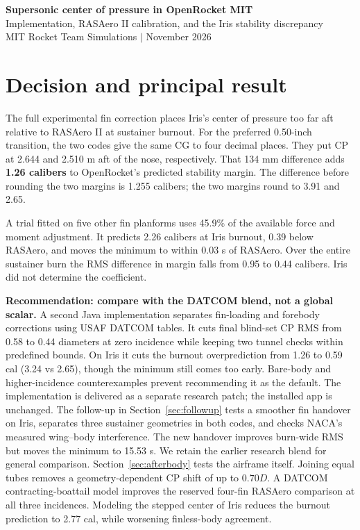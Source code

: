 \documentclass[10pt,letterpaper]{article}
\begin{document}
\begin{center}{\Large\bfseries\color{cernblue} Supersonic center of pressure in OpenRocket MIT}\\[4pt]
{\large Implementation, RASAero II calibration, and the Iris stability discrepancy}\\[6pt]
MIT Rocket Team Simulations \quad$\vert$ November 2026\end{center}
\section{Decision and principal result}
The full experimental fin correction places Iris's center of pressure too far aft relative to RASAero II at sustainer burnout. For the preferred 0.50-inch transition, the two codes give the same CG to four decimal places. They put CP at 2.644 and 2.510 m aft of the nose, respectively. That 134 mm difference adds \textbf{1.26 calibers} to OpenRocket's predicted stability margin. The difference before rounding the two margins is 1.255 calibers; the two margins round to 3.91 and 2.65.
 
A trial fitted on five other fin planforms uses 45.9\% of the available force and moment adjustment. It predicts 2.26 calibers at Iris burnout, 0.39 below RASAero, and moves the minimum to within 0.03 s of RASAero. Over the entire sustainer burn the RMS difference in margin falls from 0.95 to 0.44 calibers. Iris did not determine the coefficient.

\textbf{Recommendation: compare with the DATCOM blend, not a global scalar.} A second Java implementation separates fin-loading and forebody corrections using USAF DATCOM tables. It cuts final blind-set CP RMS from 0.58 to 0.44 diameters at zero incidence while keeping two tunnel checks within predefined bounds. On Iris it cuts the burnout overprediction from 1.26 to 0.59 cal (3.24 vs 2.65), though the minimum still comes too early. Bare-body and higher-incidence counterexamples prevent recommending it as the default. The implementation is delivered as a separate research patch; the installed app is unchanged.
The follow-up in Section~\ref{sec:followup} tests a smoother fin handover on Iris, separates three sustainer geometries in both codes, and checks NACA's measured wing--body interference. The new handover improves burn-wide RMS but moves the minimum to 15.53 s. We retain the earlier research blend for general comparison.
Section~\ref{sec:afterbody} tests the airframe itself. Joining equal tubes removes a geometry-dependent CP shift of up to $0.70D$. A DATCOM contracting-boattail model improves the reserved four-fin RASAero comparison at all three incidences. Modeling the stepped center of Iris reduces the burnout prediction to 2.77 cal, while worsening finless-body agreement.
\tableofcontents
\clearpage
\end{document}
